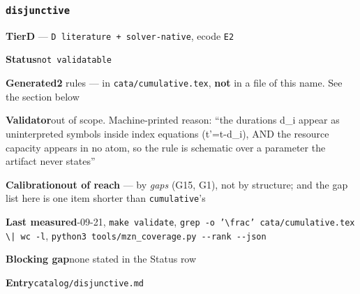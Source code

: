 \documentclass[10pt,a4paper]{article}
\newcommand{\entryfield}[2]{{\raggedright\textbf{#1}\quad #2\par}}
\begin{document}
\subsubsection*{\texttt{disjunctive}}
\label{entry:disjunctive}
\entryfield{Tier}{\textbf{D} --- \texttt{D literature + solver-\allowbreak{}native}, ecode \texttt{E2}}
\entryfield{Status}{\texttt{not validatable}}
\entryfield{Generated}{\textbf{2} rules --- in \texttt{cata/cumulative.tex}, \textbf{not} in a file of this name. See the section below}
\entryfield{Validator}{out of scope. Machine-printed reason: ``the durations d\_i appear as uninterpreted symbols inside index equations (t'=t-d\_i), AND the resource capacity appears in no atom, so the rule is schematic over a parameter the artifact never states''}
\entryfield{Calibration}{\textbf{out of reach} --- by \emph{gaps} (G15, G1), not by structure; and the gap list here is one item shorter than \texttt{cumulative}'s}
\entryfield{Last measured}{2026-09-21, \texttt{make validate}, \texttt{grep -\allowbreak{}o '\textbackslash{}frac' cata/\allowbreak{}cumulative.\allowbreak{}tex \textbackslash{}| wc -\allowbreak{}l}, \texttt{python3 tools/\allowbreak{}mzn\_\allowbreak{}coverage.\allowbreak{}py -\allowbreak{}-\allowbreak{}rank -\allowbreak{}-\allowbreak{}json}}
\entryfield{Blocking gap}{none stated in the Status row}
\entryfield{Entry}{\texttt{catalog/disjunctive.md}}
\end{document}
